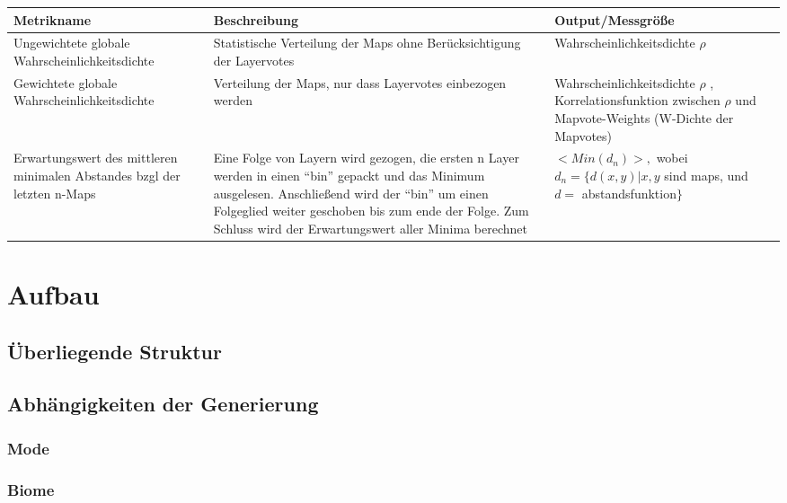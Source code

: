\documentclass[a4paper, 11pt]{scrreprt}
\begin{document}
    \begin{center}
        \begin{tabular}{||m{4cm} m{4cm} m{5cm}||}
            \hline
            Metrikname & Beschreibung & Output/Messgröße\\
            \hline
            \hline
            Ungewichtete globale Wahrscheinlichkeitsdichte & 
            Statistische Verteilung der Maps ohne Berücksichtigung der Layervotes &
            Wahrscheinlichkeitsdichte $\rho$ \\
            \hline
            Gewichtete globale Wahrscheinlichkeitsdichte &
            Verteilung der Maps, nur dass Layervotes einbezogen werden &
            Wahrscheinlichkeitsdichte $\rho$ , Korrelationsfunktion zwischen $\rho$ und Mapvote-Weights (W-Dichte der Mapvotes) \\
            \hline
            Erwartungswert des mittleren minimalen Abstandes bzgl der letzten n-Maps &
            Eine Folge von Layern wird gezogen, die ersten n Layer werden in einen “bin” gepackt und das Minimum ausgelesen.
            Anschließend wird der “bin” um einen Folgeglied weiter geschoben bis zum ende der Folge. 
            Zum Schluss wird der Erwartungswert aller Minima berechnet &
            $< Min(d_n) >,$ wobei 
            $d_n=\{d(x,y) | x,y $ 
            sind maps, und 
            $ d = $ abstandsfunktion$\}$ \\
            \hline
        \end{tabular}
    \end{center}
    


    \chapter{Aufbau}
    \section{Überliegende Struktur}
    \section{Abhängigkeiten der Generierung}
    \subsection{Mode}
    \subsection{Biome}
\end{document}
